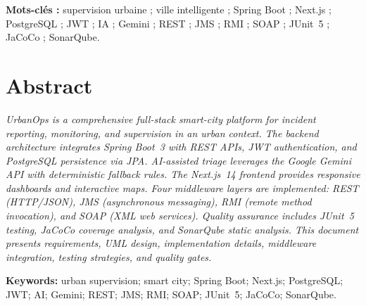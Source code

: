 \documentclass[12pt,a4paper,twoside,openright]{book}
\begin{document}
\vspace{0.9cm}
\begin{center}
\textbf{Mots-clés :} supervision urbaine ; ville intelligente ; Spring Boot ; Next.js ; PostgreSQL ; JWT ; IA ; Gemini ; REST ; JMS ; RMI ; SOAP ; JUnit~5 ; JaCoCo ; SonarQube.
\end{center}
\cleardoublepage

\chapter*{Abstract}
\thispagestyle{plain}
\begin{center}
\begin{minipage}{0.88\textwidth}
\justifying
\textit{UrbanOps is a comprehensive full-stack smart-city platform for incident reporting, monitoring, and supervision in an urban context. The backend architecture integrates Spring Boot~3 with REST APIs, JWT authentication, and PostgreSQL persistence via JPA. AI-assisted triage leverages the Google Gemini API with deterministic fallback rules. The Next.js~14 frontend provides responsive dashboards and interactive maps. Four middleware layers are implemented: REST (HTTP/JSON), JMS (asynchronous messaging), RMI (remote method invocation), and SOAP (XML web services). Quality assurance includes JUnit~5 testing, JaCoCo coverage analysis, and SonarQube static analysis. This document presents requirements, UML design, implementation details, middleware integration, testing strategies, and quality gates.}
\end{minipage}
\end{center}

\vspace{0.9cm}
\begin{center}
\textbf{Keywords:} urban supervision; smart city; Spring Boot; Next.js; PostgreSQL; JWT; AI; Gemini; REST; JMS; RMI; SOAP; JUnit~5; JaCoCo; SonarQube.
\end{center}
\cleardoublepage

\end{document}
